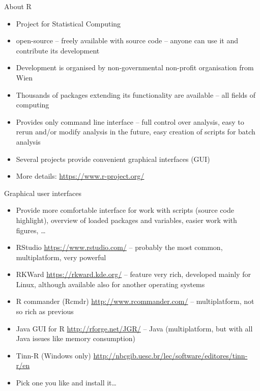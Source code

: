 \documentclass[compress, ucs, xelatex, 11pt, xcolor=svgnames,
  hyperref={
    bookmarks=true,
    unicode=true,
    colorlinks=true,
    pdftitle={Molecular data in R},
    plainpages=false,
    pdfauthor={Vojtech Zeisek},
    pdfsubject={Course about phylogeny and evolution in R},
    pdfcreator={XeLaTeX},
    pdfkeywords={R, evolution, phylogeny, molecular data},
    linkcolor=Tomato,
    anchorcolor=SaddleBrown,
    citecolor=Goldenrod,
    filecolor=DarkMagenta,
    menucolor=Sienna,
    urlcolor=DarkTurquoise,
    pdftex},
  url={hyphens, lowtilde} %
  ]{beamer}
\begin{document}
\begin{frame}{About R}
\begin{itemize}
 \item Project for Statistical Computing
 \item open-source -- freely available with source code -- anyone can use it and contribute its development
 \item Development is organised by non-governmental non-profit organisation from Wien
 \item Thousands of packages extending its functionality are available -- all fields of computing
 \item Provides only command line interface -- full control over analysis, easy to rerun and/or modify analysis in the future, easy creation of scripts for batch analysis
 \item Several projects provide convenient graphical interfaces (GUI)
 \item More details: \url{https://www.r-project.org/}
\end{itemize}
\end{frame}

\begin{frame}{Graphical user interfaces}
\begin{itemize}
 \item Provide more comfortable interface for work with scripts (source code highlight), overview of loaded packages and variables, easier work with figures, \ldots
 \item RStudio \url{https://www.rstudio.com/} -- probably the most common, multiplatform, very powerful
 \item RKWard \url{https://rkward.kde.org/} -- feature very rich, developed mainly for Linux, although available also for another operating systems
 \item R commander (Rcmdr) \url{http://www.rcommander.com/} -- multiplatform, not so rich as previous
 \item Java GUI for R \url{http://rforge.net/JGR/} -- Java (multiplatform, but with all Java issues like memory consumption)
 \item Tinn-R (Windows only) \url{http://nbcgib.uesc.br/lec/software/editores/tinn-r/en}
 \item Pick one you like and install it\ldots
\end{itemize}
\end{frame}
\end{document}
